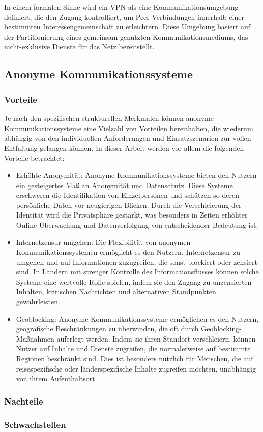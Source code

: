 In einem formalen Sinne wird ein VPN als eine Kommunikationsumgebung definiert, die den Zugang kontrolliert, um Peer-Verbindungen innerhalb einer bestimmten Interessengemeinschaft zu erleichtern. Diese Umgebung basiert auf der Partitionierung eines gemeinsam genutzten Kommunikationsmediums, das nicht-exklusive Dienste für das Netz bereitstellt\footnotemark{}.

\subsection{Anonyme Kommunikationssysteme}

\subsubsection{Vorteile}

Je nach den spezifischen strukturellen Merkmalen können anonyme Kommunikationssysteme eine Vielzahl von Vorteilen bereithalten, die wiederum abhängig von den individuellen Anforderungen und Einsatzszenarien zur vollen Entfaltung gelangen können. In dieser Arbeit werden vor allem die folgenden Vorteile betrachtet:

\begin{itemize}

\item Erhöhte Anonymität: Anonyme Kommunikationssysteme bieten den Nutzern ein gesteigertes Maß an Anonymität und Datenschutz. Diese Systeme erschweren die Identifikation von Einzelpersonen und schützen so deren persönliche Daten vor neugierigen Blicken. Durch die Verschleierung der Identität wird die Privatsphäre gestärkt, was besonders in Zeiten erhöhter Online-Überwachung und Datenverfolgung von entscheidender Bedeutung ist.

\item Internetzensur umgehen: Die Flexibilität von anonymen Kommunikationssystemen ermöglicht es den Nutzern, Internetzensur zu umgehen und auf Informationen zuzugreifen, die sonst blockiert oder zensiert sind. In Ländern mit strenger Kontrolle des Informationsflusses können solche Systeme eine wertvolle Rolle spielen, indem sie den Zugang zu unzensierten Inhalten, kritischen Nachrichten und alternativen Standpunkten gewährleisten.

\item Geoblocking: Anonyme Kommunikationssysteme ermöglichen es den Nutzern, geografische Beschränkungen zu überwinden, die oft durch Geoblocking-Maßnahmen auferlegt werden. Indem sie ihren Standort verschleiern, können Nutzer auf Inhalte und Dienste zugreifen, die normalerweise auf bestimmte Regionen beschränkt sind. Dies ist besonders nützlich für Menschen, die auf reisespezifische oder länderspezifische Inhalte zugreifen möchten, unabhängig von ihrem Aufenthaltsort.

\end{itemize}

\subsubsection{Nachteile}

\subsubsection{Schwachstellen}
